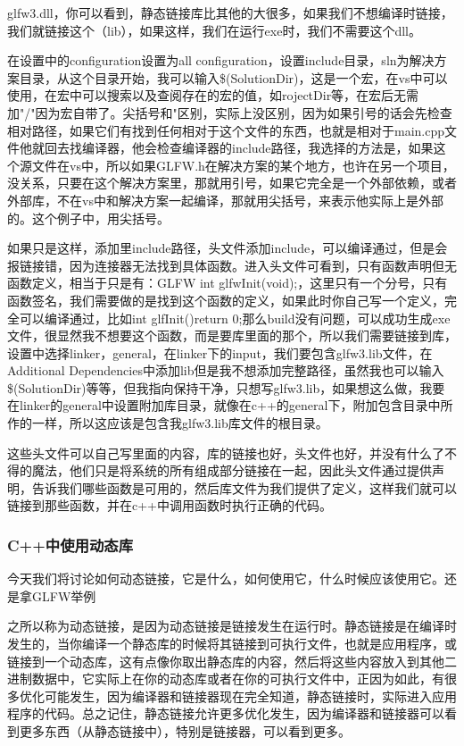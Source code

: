 glfw3.dll，你可以看到，静态链接库比其他的大很多，如果我们不想编译时链接，我们就链接这个（lib），如果这样，我们在运行exe时，我们不需要这个dll。

在设置中的configuration设置为all configuration，设置include目录，sln为解决方案目录，从这个目录开始，我可以输入\$(SolutionDir)，这是一个宏，在vs中可以使用，在宏中可以搜索以及查阅存在的宏的值，如rojectDir等，在宏后无需加"/"因为宏自带了。尖括号和"区别，实际上没区别，因为如果引号的话会先检查相对路径，如果它们有找到任何相对于这个文件的东西，也就是相对于main.cpp文件他就回去找编译器，他会检查编译器的include路径，我选择的方法是，如果这个源文件在vs中，所以如果GLFW.h在解决方案的某个地方，也许在另一个项目，没关系，只要在这个解决方案里，那就用引号，如果它完全是一个外部依赖，或者外部库，不在vs中和解决方案一起编译，那就用尖括号，来表示他实际上是外部的。这个例子中，用尖括号。

如果只是这样，添加里include路径，头文件添加include，可以编译通过，但是会报链接错，因为连接器无法找到具体函数。进入头文件可看到，只有函数声明但无函数定义，相当于只是有：{\ncodestyle GLFW int glfwInit(void);}，这里只有一个分号，只有函数签名，我们需要做的是找到这个函数的定义，如果此时你自己写一个定义，完全可以编译通过，比如{\ncodestyle int glfInit(){return 0;}}那么build没有问题，可以成功生成exe文件，很显然我不想要这个函数，而是要库里面的那个，所以我们需要链接到库，设置中选择linker，general，在linker下的input，我们要包含glfw3.lib文件，在Additional Dependencies中添加lib但是我不想添加完整路径，虽然我也可以输入\$(SolutionDir)等等，但我指向保持干净，只想写glfw3.lib，如果想这么做，我要在linker的general中设置附加库目录，就像在c++的general下，附加包含目录中所作的一样，所以这应该是包含我glfw3.lib库文件的根目录。

这些头文件可以自己写里面的内容，库的链接也好，头文件也好，并没有什么了不得的魔法，他们只是将系统的所有组成部分链接在一起，因此头文件通过提供声明，告诉我们哪些函数是可用的，然后库文件为我们提供了定义，这样我们就可以链接到那些函数，并在c++中调用函数时执行正确的代码。

\subsubsection{C++中使用动态库}

今天我们将讨论如何动态链接，它是什么，如何使用它，什么时候应该使用它。还是拿GLFW举例

之所以称为动态链接，是因为动态链接是链接发生在运行时。静态链接是在编译时发生的，当你编译一个静态库的时候将其链接到可执行文件，也就是应用程序，或链接到一个动态库，这有点像你取出静态库的内容，然后将这些内容放入到其他二进制数据中，它实际上在你的动态库或者在你的可执行文件中，正因为如此，有很多优化可能发生，因为编译器和链接器现在完全知道，静态链接时，实际进入应用程序的代码。总之记住，静态链接允许更多优化发生，因为编译器和链接器可以看到更多东西（从静态链接中），特别是链接器，可以看到更多。

